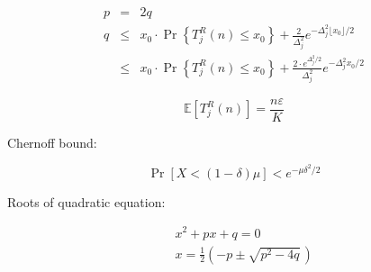 \documentclass{article}
\newcommand {\IE} {\ensuremath {\mathbb{E}}}
\begin{document}
\begin{eqnarray*}
p&=&2q \\
q&\le&x_0\cdot \Pr\left\{T_j^R(n)\le x_0\right\} + \frac 2
{\Delta_j^2}e^{-\Delta_j^2\lfloor x_0 \rfloor/2}\\
&\le&x_0\cdot \Pr\left\{T_j^R(n)\le x_0\right\} + \frac {2 \cdot
  e^{\Delta_j^2/2}}
{\Delta_j^2}e^{-\Delta_j^2 x_0 /2}
\end{eqnarray*}

\begin{equation*}
\IE\left[T_j^R(n)\right]=\frac {n\varepsilon} K
\end{equation*}

Chernoff bound:

\begin{equation*}
\Pr[X < (1-\delta)\mu] < e^{-\mu\delta^2/2}
\end{equation*}
\begin{equation}
\end{equation}

Roots of quadratic equation:

\begin{eqnarray*}
& &x^2 + px + q=0\\
& &x =\frac 1 2 \left( -p \pm \sqrt{p^2 - 4q} \,\right) \\
\end{eqnarray*}
\end{document}

